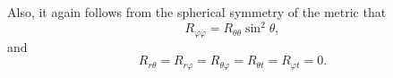 Also, it again follows from the spherical symmetry of the metric that
\begin{equation}
  R_{\varphi\varphi}=R_{\theta\theta}\sin^2\theta,
  \tag{11.8.18}\label{eq:11.8.18}
\end{equation}
and
\begin{equation}
  R_{r\theta}=R_{r\varphi}=R_{\theta\varphi}
  =R_{\theta t}=R_{\varphi t}=0.
  \tag{11.8.19}\label{eq:11.8.19}
\end{equation}
